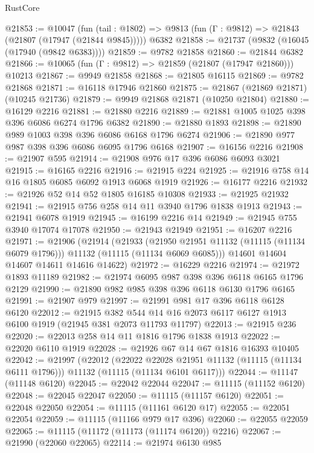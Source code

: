 \begin{lexlean}{RustCore}
\begin{coremodule}
@21853 := @10047
    (fun (tail : @1802) => @9813 (fun (Γ : @9812) => @21843 (@21807 (@17947 (@21844 @9845)))))
    @6382
@21858 := @21737 (@9832 (@16045 (@17940 (@9842 @6383))))
@21859 := @9782 @21858
@21860 := @21844 @6382
@21866 := @10065 (fun (Γ : @9812) => @21859 (@21807 (@17947 @21860))) @10213
@21867 := @9949 @21858
@21868 := @21805 @16115
@21869 := @9782 @21868
@21871 := @16118 @17946 @21860
@21875 := @21867 (@21869 @21871) (@10245 @21736)
@21879 := @9949 @21868 @21871 (@10250 @21804)
@21880 := @16129 @2216
@21881 := @21880 @2216
@21889 := @21881 @1005 @1025 @398 @396 @6086 @6274 @1796 @6382
@21890 := @21880 @1893
@21898 := @21890 @989 @1003 @398 @396 @6086 @6168 @1796 @6274
@21906 := @21890 @977 @987 @398 @396 @6086 @6095 @1796 @6168
@21907 := @16156 @2216
@21908 := @21907 @595
@21914 := @21908 @976 @17 @396 @6086 @6093 @3021
@21915 := @16165 @2216
@21916 := @21915 @224
@21925 := @21916 @758 @14 @16 @1805 @6085 @6092 @1913 @6068 @1919
@21926 := @16177 @2216
@21932 := @21926 @52 @14 @52 @1805 @16185 @10308
@21933 := @21925 @21932
@21941 := @21915 @756 @258 @14 @11 @3940 @1796 @1838 @1913
@21943 := @21941 @6078 @1919
@21945 := @16199 @2216 @14
@21949 := @21945 @755 @3940 @17074 @17078
@21950 := @21943 @21949
@21951 := @16207 @2216
@21971 := @21906
    (@21914
      (@21933
        (@21950 @21951 @11132 (@11115 (@11134 @6079 @1796)))
        @11132
        (@11115 (@11134 @6069 @6085)))
      @14601
      @14604
      @14607
      @14611
      @14616
      @14622)
@21972 := @16229 @2216
@21974 := @21972 @1893 @11189
@21982 := @21974 @6095 @987 @398 @396 @6118 @6165 @1796 @2129
@21990 := @21890 @982 @985 @398 @396 @6118 @6130 @1796 @6165
@21991 := @21907 @979
@21997 := @21991 @981 @17 @396 @6118 @6128 @6120
@22012 := @21915
    @382
    @544
    @14
    @16
    @2073
    @6117
    @6127
    @1913
    @6100
    @1919
    (@21945 @381 @2073 @11793 @11797)
@22013 := @21915 @236
@22020 := @22013 @258 @14 @11 @1816 @1796 @1838 @1913
@22022 := @22020 @6110 @1919
@22028 := @21926 @67 @14 @67 @1816 @16393 @10405
@22042 := @21997
    (@22012
      (@22022 @22028 @21951 @11132 (@11115 (@11134 @6111 @1796)))
      @11132
      (@11115 (@11134 @6101 @6117)))
@22044 := @11147 (@11148 @6120)
@22045 := @22042 @22044
@22047 := @11115 (@11152 @6120)
@22048 := @22045 @22047
@22050 := @11115 (@11157 @6120)
@22051 := @22048 @22050
@22054 := @11115 (@11161 @6120 @17)
@22055 := @22051 @22054
@22059 := @11115 (@11166 @979 @17 @396)
@22060 := @22055 @22059
@22065 := @11115 (@11172 (@11173 (@11174 @6120)) @2216)
@22067 := @21990 (@22060 @22065)
@22114 := @21974
    @6130
    @985

\end{coremodule}
\end{lexlean}
